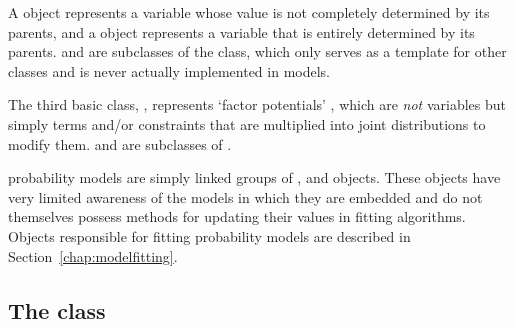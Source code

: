 \documentclass[]{jss}
\begin{document}
A  object represents a variable whose value is not completely determined by its parents, and a  object represents a variable that is entirely determined by its parents.  and  are subclasses of the  class, which only serves as a template for other classes and is never actually implemented in models.

The third basic class, , represents `factor potentials' \citep{dawidmarkov,Jordan:2004p5439}, which are \emph{not} variables but simply terms and/or constraints that are multiplied into joint distributions to modify them.  and  are subclasses of .

\medskip
{} probability models are simply linked groups of ,  and  objects. These objects have very limited awareness of the models in which they are embedded and do not themselves possess methods for updating their values in fitting algorithms. Objects responsible for fitting probability models are described in Section~\ref{chap:modelfitting}.



\subsection[The Stochastic class]{The  class}
\label{stochastic}
\end{document}
